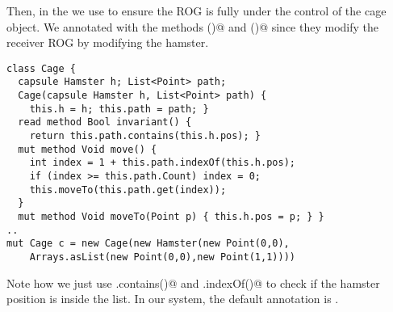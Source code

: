 Then, in the \Q@Cage@
we use \Q@capsule@ to ensure
the \Q@Hamster@ ROG is fully under the control
of the cage object.
We annotated with \Q@mut@ the methods \Q@move()@
and \Q@moveTo()@ since they modify
the receiver ROG by modifying the hamster.
\begin{lstlisting}
class Cage {
  capsule Hamster h; List<Point> path;
  Cage(capsule Hamster h, List<Point> path) {
    this.h = h; this.path = path; }
  read method Bool invariant() {
    return this.path.contains(this.h.pos); }
  mut method Void move() {
    int index = 1 + this.path.indexOf(this.h.pos);
    if (index >= this.path.Count) index = 0;
    this.moveTo(this.path.get(index));
  }
  mut method Void moveTo(Point p) { this.h.pos = p; } }
..
mut Cage c = new Cage(new Hamster(new Point(0,0), 
	Arrays.asList(new Point(0,0),new Point(1,1))))
\end{lstlisting}
Note how we just use \Q@List.contains()@ and \Q@List.indexOf()@
to check if the hamster position is inside the list.
In our system, the default annotation is \Q@immutable@.

